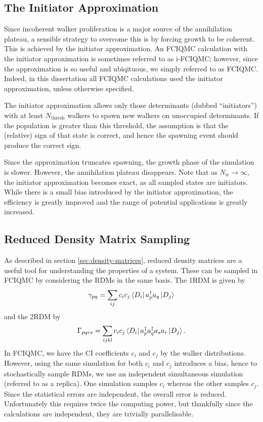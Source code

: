 \subsection{The Initiator Approximation}

Since incoherent walker proliferation is a major source of the annihilation plateau, a sensible strategy to overcome this is by forcing growth to be coherent. This is achieved by the initiator approximation.\supercite{Cleland_initiator_2010} An \gls{FCIQMC} calculation with the initiator approximation is sometimes referred to as i-FCIQMC; however, since the approximation is so useful and ubiqituous, we simply referred to as FCIQMC. Indeed, in this dissertation all FCIQMC calculations used the initiator approximation, unless otherwise specified.

The initiator approximation allows only those determinants (dubbed ``initiators'') with at least $N_\mathrm{thresh}$ walkers to spawn new walkers on unoccupied determinants. If the population is greater than this threshold, the assumption is that the (relative) sign of that state is correct, and hence the spawning event should produce the correct sign.

Since the approximation truncates spawning, the growth phase of the simulation is slower. However, the annihilation plateau disappears. Note that as $N_w\to\infty$, the initiator approximation becomes exact, as all sampled states are initiators. While there is a small bias introduced by the initiator approximation, the efficiency is greatly improved and the range of potential applications is greatly increased.

\subsection{Reduced Density Matrix Sampling}
\label{sec:fciqmc_rdm}
As described in section \ref{sec:density-matrices}, reduced density matrices are a useful tool for understanding the properties of a system. These can be sampled in \gls{FCIQMC} by considering the RDMs in the same basis.\supercite{overyUnbiased2014} The \gls{1RDM} is given by
\begin{equation}
    \gamma_{pq} = \sum_{ij} c_ic_j \bra{D_i}a_p^\dag a_q\ket{D_j}
\end{equation}
and the \gls{2RDM} by
\begin{equation}
    \Gamma_{pqrs} = \sum_{ijkl} c_ic_j \bra{D_i}a_p^\dag a_q^\dag a_s a_r\ket{D_j}.
\end{equation}
In FCIQMC, we have the \gls{CI} coefficients $c_i$ and $c_j$ by the walker distributions. However, using the same simulation for both $c_i$ and $c_j$ introduces a bias, hence to stochastically sample RDMs, we use an independent simultaneous simulation (referred to as a replica). One simulation samples $c_i$ whereas the other samples $c_j$. Since the statistical errors are independent, the overall error is reduced. Unfortunately this requires twice the computing power, but thankfully since the calculations are independent, they are trivially parallelisable.

